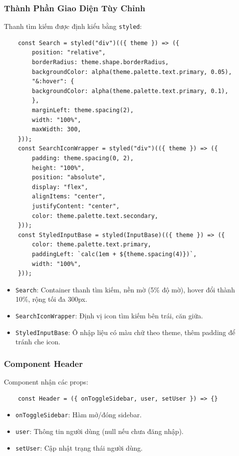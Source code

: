             \subsubsection{Thành Phần Giao Diện Tùy Chỉnh}
                \hspace*{0.6cm}Thanh tìm kiếm được định kiểu bằng \texttt{styled}:
                \begin{lstlisting}
    const Search = styled("div")(({ theme }) => ({
        position: "relative",
        borderRadius: theme.shape.borderRadius,
        backgroundColor: alpha(theme.palette.text.primary, 0.05),
        "&:hover": {
        backgroundColor: alpha(theme.palette.text.primary, 0.1),
        },
        marginLeft: theme.spacing(2),
        width: "100%",
        maxWidth: 300,
    }));
    const SearchIconWrapper = styled("div")(({ theme }) => ({
        padding: theme.spacing(0, 2),
        height: "100%",
        position: "absolute",
        display: "flex",
        alignItems: "center",
        justifyContent: "center",
        color: theme.palette.text.secondary,
    }));
    const StyledInputBase = styled(InputBase)(({ theme }) => ({
        color: theme.palette.text.primary,
        paddingLeft: `calc(1em + ${theme.spacing(4)})`,
        width: "100%",
    }));
                \end{lstlisting}
                \begin{itemize}
                    \item \texttt{Search}: Container thanh tìm kiếm, nền mờ (5\% độ mờ), hover đổi thành 10\%, rộng tối đa 300px.
                    \item \texttt{SearchIconWrapper}: Định vị icon tìm kiếm bên trái, căn giữa.
                    \item \texttt{StyledInputBase}: Ô nhập liệu có màu chữ theo theme, thêm padding để tránh che icon.
                \end{itemize}

            \subsubsection{Component Header}
                \hspace*{0.6cm}Component nhận các props:
                \begin{lstlisting}
    const Header = ({ onToggleSidebar, user, setUser }) => {}
                \end{lstlisting}
                \begin{itemize}
                    \item \texttt{onToggleSidebar}: Hàm mở/đóng sidebar.
                    \item \texttt{user}: Thông tin người dùng (null nếu chưa đăng nhập).
                    \item \texttt{setUser}: Cập nhật trạng thái người dùng.
                \end{itemize}

